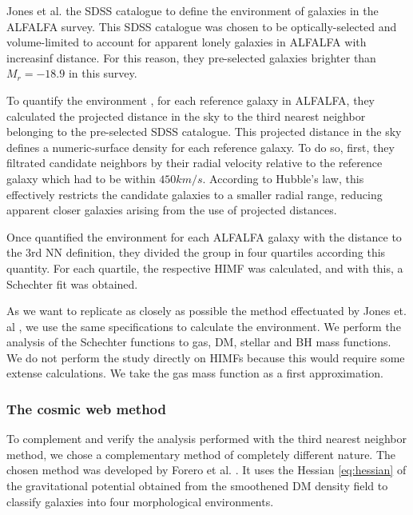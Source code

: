 \documentclass[a4paper,fleqn,usenatbib]{mnras}
\begin{document}
Jones et al. \cite{Jones2016} the SDSS \cite{SDSS2011} catalogue to
define the environment of galaxies in the ALFALFA \cite{ALFALFA}
survey. 
This SDSS catalogue was chosen to be optically-selected and
volume-limited to account for apparent lonely galaxies in ALFALFA with
increasinf distance.  
For this reason, they pre-selected galaxies brighter than $M_r =
-18.9$ in this survey.

To quantify the environment , for each reference galaxy in ALFALFA,
they calculated the projected distance in the sky to the third nearest
neighbor belonging to the pre-selected SDSS catalogue. 
This projected distance in the sky defines a numeric-surface density for each reference galaxy.
To do so, first, they filtrated candidate neighbors by their radial
velocity relative to the reference galaxy which had to be within
$450km/s$. 
According to Hubble's law, this effectively restricts the candidate
galaxies to a smaller radial range, reducing apparent closer galaxies
arising from the use of projected distances.  

Once quantified the environment for each ALFALFA galaxy with the distance to the 3rd NN definition, they divided the group in four quartiles according this quantity. 
For each quartile, the respective HIMF was calculated, and with this, a Schechter fit was obtained. 
 
As we want to replicate as closely as possible the method effectuated
by Jones et. al \cite{Jones2016}, we use the same specifications to
calculate the environment. 
We perform the analysis of the Schechter functions to gas, DM, stellar and BH mass functions.
We do not perform the study directly on HIMFs because this would
require some extense calculations. We take the gas mass function as a
first approximation. 

\subsubsection{The cosmic web method}
To complement and verify the analysis performed with the third nearest
neighbor method, we chose a complementary method of completely
different nature.  
The chosen method was developed by Forero et al. \cite{Forero2009}. 
It uses the Hessian \ref{eq:hessian} of the gravitational potential
obtained from the smoothened DM density field to classify galaxies
into four morphological environments.
\end{document}
